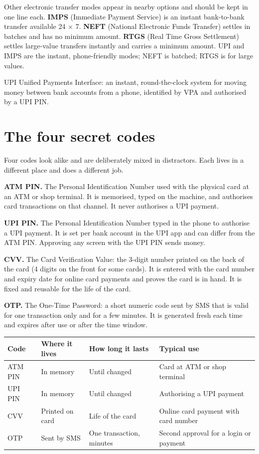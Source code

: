 Other electronic transfer modes appear in nearby options and should be kept
in one line each. \textbf{IMPS} (Immediate Payment Service) is an instant
bank-to-bank transfer available 24 $\times$ 7. \textbf{NEFT} (National
Electronic Funds Transfer) settles in batches and has no minimum amount.
\textbf{RTGS} (Real Time Gross Settlement) settles large-value transfers
instantly and carries a minimum amount. UPI and IMPS are the instant,
phone-friendly modes; NEFT is batched; RTGS is for large values.

\begin{definitionbox}{UPI}
Unified Payments Interface: an instant, round-the-clock system for moving
money between bank accounts from a phone, identified by VPA and authorised by
a UPI PIN.
\end{definitionbox}

\section{The four secret codes}
Four codes look alike and are deliberately mixed in distractors. Each lives
in a different place and does a different job.

\textbf{ATM PIN.} The Personal Identification Number used with the physical
card at an ATM or shop terminal. It is memorised, typed on the machine, and
authorises card transactions on that channel. It never authorises a UPI
payment.

\textbf{UPI PIN.} The Personal Identification Number typed in the phone to
authorise a UPI payment. It is set per bank account in the UPI app and can
differ from the ATM PIN. Approving any screen with the UPI PIN sends money.

\textbf{CVV.} The Card Verification Value: the 3-digit number printed on the
back of the card (4 digits on the front for some cards). It is entered with
the card number and expiry date for online card payments and proves the
card is in hand. It is fixed and reusable for the life of the card.

\textbf{OTP.} The One-Time Password: a short numeric code sent by SMS that
is valid for one transaction only and for a few minutes. It is generated
fresh each time and expires after use or after the time window.

\begin{center}
\begin{tabular}{p{}p{}p{}p{}}
\toprule
\textbf{Code} & \textbf{Where it lives} & \textbf{How long it lasts} & \textbf{Typical use} \\
\midrule
ATM PIN & In memory & Until changed & Card at ATM or shop terminal \\
UPI PIN & In memory & Until changed & Authorising a UPI payment \\
CVV & Printed on card & Life of the card & Online card payment with card number \\
OTP & Sent by SMS & One transaction, minutes & Second approval for a login or payment \\
\bottomrule
\end{tabular}
\end{center}

